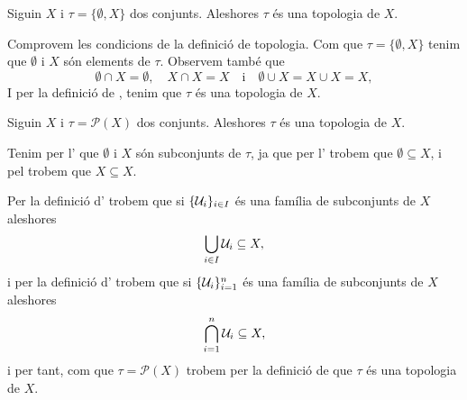 \documentclass[../Apunts.tex]{subfiles}
\begin{document}
	\begin{example}
		\label{ex:topologia grollera}
		Siguin \(X\) i \(\tau=\{\emptyset,X\}\) dos conjunts. Aleshores \(\tau\) és una topologia de \(X\).
		\begin{solution}
			Comprovem les condicions de la definició de topologia. Com que \(\tau=\{\emptyset,X\}\) tenim que \(\emptyset\) i \(X\) són elements de \(\tau\). Observem també que
			\[\emptyset\cap X=\emptyset,\quad X\cap X=X\quad\text{i}\quad\emptyset\cup X=X\cup X=X,\]
			I per la definició de , tenim que \(\tau\) és una topologia de \(X\).
		\end{solution}
	\end{example}
	\begin{example}
		\label{ex:topologia discreta}
		Siguin \(X\) i \(\tau=\mathcal{P}(X)\) dos conjunts. Aleshores \(\tau\) és una topologia de \(X\).
		\begin{solution}
			Tenim per l' que \(\emptyset\) i \(X\) són subconjunts de \(\tau\), ja que per l' trobem que \(\emptyset\subseteq X\), i pel  trobem que \(X\subseteq X\).
			
			Per la definició d' trobem que si \(\{\mathcal{U}_{i}\}_{i\in I}\) és una família de subconjunts de \(X\) aleshores
			\[\bigcup_{i\in I}\mathcal{U}_{i}\subseteq X,\]
			i per la definició d' trobem que si \(\{\mathcal{U}_{i}\}_{i=1}^{n}\) és una família de subconjunts de \(X\) aleshores
			\[\bigcap_{i=1}^{n}\mathcal{U}_{i}\subseteq X,\]
			i per tant, com que \(\tau=\mathcal{P}(X)\) trobem per la definició de  que \(\tau\) és una topologia de \(X\).
		\end{solution}
	\end{example}
\end{document}
